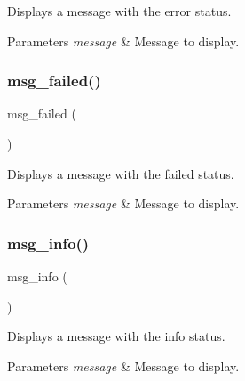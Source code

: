 Displays a message with the \textquotesingle{}error\textquotesingle{} status. 


\begin{DoxyParams}{Parameters}
{\em message} & Message to display. \\
\hline
\end{DoxyParams}
\mbox{\label{group__message_ga1051f1ddca193760016f3021e885dfbb}} 
\subsubsection{\texorpdfstring{msg\+\_\+failed()}{msg\_failed()}}
{\footnotesize\ttfamily msg\+\_\+failed (\begin{DoxyParamCaption}\item[{message}]{ }\end{DoxyParamCaption})}



Displays a message with the \textquotesingle{}failed\textquotesingle{} status. 


\begin{DoxyParams}{Parameters}
{\em message} & Message to display. \\
\hline
\end{DoxyParams}
\mbox{\label{group__message_gad043c4df79f7cc2143ab6d3a67ea20da}} 
\subsubsection{\texorpdfstring{msg\+\_\+info()}{msg\_info()}}
{\footnotesize\ttfamily msg\+\_\+info (\begin{DoxyParamCaption}\item[{message}]{ }\end{DoxyParamCaption})}



Displays a message with the \textquotesingle{}info\textquotesingle{} status. 


\begin{DoxyParams}{Parameters}
{\em message} & Message to display. \\
\hline
\end{DoxyParams}
\mbox{\label{group__message_gadba552b40430d43c306129dccb9bb6ba}} 
